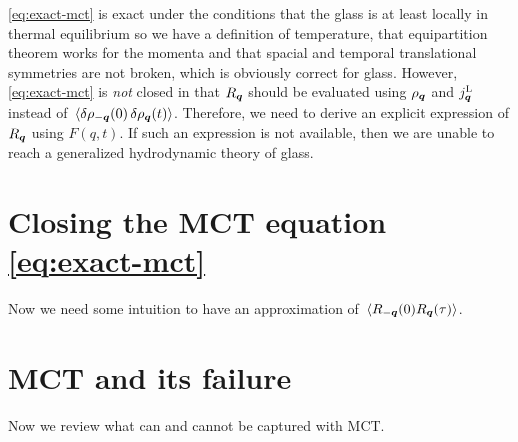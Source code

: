 \documentclass[hyperref, a4paper]{article}
\begin{document}
\eqref{eq:exact-mct} is exact under the conditions that the glass is at least locally in thermal equilibrium
so we have a definition of temperature, that equipartition theorem works for the momenta and that spacial and 
temporal translational symmetries are not broken, which is obviously correct for glass. 
However, \eqref{eq:exact-mct} is \emph{not} closed in that $R_{\vb*{q}}$ should be evaluated using $\rho_{\vb*{q}}$
and $j^\text{L}_{\vb*{q}}$ instead of $\expval*{\var{\rho_{-\vb*{q}}(0)} \var{\rho_{\vb*{q}}(t)}}$. 
Therefore, we need to derive an explicit expression of $R_{\vb*{q}}$ using $F(q, t)$. 
If such an expression is not available, then we are unable to reach a generalized hydrodynamic theory 
of glass. 

\section{Closing the MCT equation \eqref{eq:exact-mct}}

Now we need some intuition to have an approximation of $\expval*{R_{-\vb*{q}}(0) R_{\vb*{q}}(\tau)}$.

\section{MCT and its failure}

Now we review what can and cannot be captured with MCT. 


 
\end{document}
